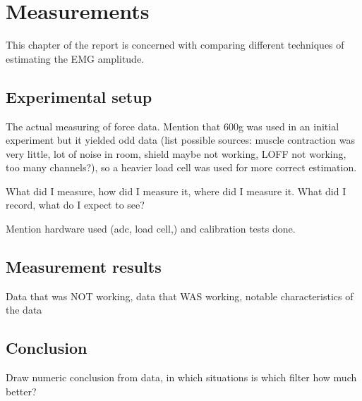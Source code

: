 \chapter{Measurements}
This chapter of the report is concerned with comparing different techniques of estimating the EMG amplitude.

\section{Experimental setup}
The actual measuring of force data. Mention that 600g was used in an initial experiment but it yielded odd data (list possible sources: muscle contraction was very little, lot of noise in room, shield maybe not working, LOFF not working, too many channels?), so a heavier load cell was used for more correct estimation.

What did I measure, how did I measure it, where did I measure it. What did I record, what do I expect to see?

Mention hardware used (adc, load cell,) and calibration tests done.
\section{Measurement results}
Data that was NOT working, data that WAS working, notable characteristics of the data


\section{Conclusion}
Draw numeric conclusion from data, in which situations is which filter how much better?